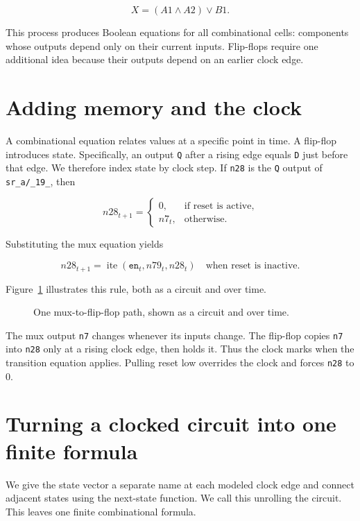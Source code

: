 \documentclass[11pt]{article}
\newcommand{\fitwidth}[1]{\resizebox{\ifdim\width>\linewidth\linewidth\else\width\fi}{!}{#1}}
\begin{document}
\[
  X=(A1\land A2)\lor B1.
\]

This process produces Boolean equations for all combinational cells: components whose outputs depend only on their current inputs. Flip-flops require one additional idea because their outputs depend on an earlier clock edge.

\section{Adding memory and the clock}

A combinational equation relates values at a specific point in time. A flip-flop introduces state. Specifically, an output \texttt{Q} after a rising edge equals \texttt{D} just before that edge. We therefore index state by clock step. If \texttt{n28} is the \texttt{Q} output of \texttt{sr\_a/\_19\_}, then

\[
  n28_{t+1}=\begin{cases}
    0,&\text{if reset is active},\\
    n7_t,&\text{otherwise}.
  \end{cases}
\]

Substituting the mux equation yields

\[
  n28_{t+1}=\operatorname{ite}(\texttt{en}_t,n79_t,n28_t)
  \quad\text{when reset is inactive.}
\]

Figure~\ref{fig:warmup-state} illustrates this rule, both as a circuit and over time.

\begin{figure}[H]
  \centering
  \fitwidth{}
  \caption{One mux-to-flip-flop path, shown as a circuit and over time.}
  \label{fig:warmup-state}
\end{figure}

The mux output \texttt{n7} changes whenever its inputs change. The flip-flop copies \texttt{n7} into \texttt{n28} only at a rising clock edge, then holds it. Thus the clock marks when the transition equation applies. Pulling reset low overrides the clock and forces \texttt{n28} to 0.

\section{Turning a clocked circuit into one finite formula}

We give the state vector a separate name at each modeled clock edge and connect adjacent states using the next-state function. We call this unrolling the circuit. This leaves one finite combinational formula.
\end{document}

